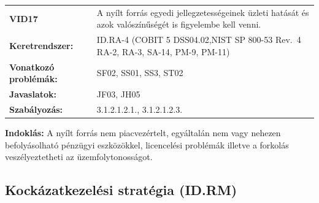 \documentclass[12pt,magyar,a4paper,oneside]{scrreprt}
\begin{document}
\begin{longtable}[]{@{}ll@{}}
\toprule
\endhead
\begin{minipage}[t]{0.16\columnwidth}\raggedright
\textbf{VID17}\strut
\end{minipage} & \begin{minipage}[t]{0.79\columnwidth}\raggedright
A nyílt forrás egyedi jellegzetességeinek üzleti hatását és azok
valószínűségét is figyelembe kell venni.\strut
\end{minipage}\tabularnewline
\begin{minipage}[t]{0.16\columnwidth}\raggedright
\textbf{Keretrendszer:}\strut
\end{minipage} & \begin{minipage}[t]{0.79\columnwidth}\raggedright
ID.RA-4 (COBIT 5 DSS04.02,NIST SP 800-53 Rev.~4 RA-2, RA-3, SA-14, PM-9,
PM-11)\strut
\end{minipage}\tabularnewline
\begin{minipage}[t]{0.16\columnwidth}\raggedright
\textbf{Vonatkozó problémák:}\strut
\end{minipage} & \begin{minipage}[t]{0.79\columnwidth}\raggedright
SF02, SS01, SS3, ST02\strut
\end{minipage}\tabularnewline
\begin{minipage}[t]{0.16\columnwidth}\raggedright
\textbf{Javaslatok:}\strut
\end{minipage} & \begin{minipage}[t]{0.79\columnwidth}\raggedright
JF03, JH05\strut
\end{minipage}\tabularnewline
\begin{minipage}[t]{0.16\columnwidth}\raggedright
\textbf{Szabályozás:}\strut
\end{minipage} & \begin{minipage}[t]{0.79\columnwidth}\raggedright
3.1.2.1.2.1., 3.1.2.1.2.3.\strut
\end{minipage}\tabularnewline
\bottomrule
\end{longtable}

\textbf{Indoklás: } A nyílt forrás nem piacvezértelt, egyáltalán nem
vagy nehezen befolyásolható pénzügyi eszközökkel, licencelési problémák
illetve a forkolás veszélyeztetheti az üzemfolytonosságot.

\hypertarget{kockuxe1zatkezeluxe9si-stratuxe9gia-id.rm}{%
\subsection{Kockázatkezelési stratégia
(ID.RM)}\label{kockuxe1zatkezeluxe9si-stratuxe9gia-id.rm}}
\end{document}
